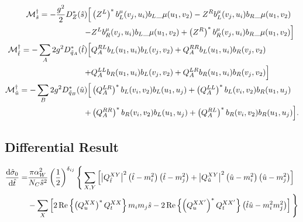 \documentclass[../main.tex]{subfiles}
\begin{document}
\begin{temporary}

	\begin{subequations}
		\begin{align}
			\nonumber
			\M^\dagger_{\hat{s}} = -\frac{g^2}{2} D_Z^\ast(\hat{s}) \Big[           & \pclosed{Z^L}^\ast b_L^\mu(v_j, u_i){b_L}\_{\mu}(u_1, v_2) - Z^R b_L^\mu(v_j, u_i){b_R}\_{\mu}(u_1, v_2)         \\
			-                                                                       & Z^L b_R^\mu(v_j, u_i){b_L}\_{\mu}(u_1, v_2) + \pclosed{Z^R}^\ast b_R^\mu(v_j, u_i){b_R}\_{\mu}(u_1, v_2) \Big]   \\
			\nonumber
			\M^\dagger_{\hat{t}} = -\sum_A 2g^2 D^\ast_{\tilde{q}_A}(\hat{t}) \Big[ & Q_A^{RL} b_L(u_1, u_i) b_L(v_j, v_2) +  Q_A^{RR} b_L(u_1, u_i) b_R(v_j, v_2)                                     \\
			+                                                                       & Q_A^{LL} b_R(u_1, u_i) b_L(v_j, v_2) + Q_A^{LR} b_R(u_1, u_i) b_R(v_j, v_2) \Big]                                \\
			\nonumber
			\M^\dagger_{\hat{u}} = -\sum_B 2g^2 D^\ast_{\tilde{q}_B}(\hat{u}) \Big[ & \pclosed{Q_A^{LR}}^\ast b_L(v_i, v_2) b_L(u_1, u_j) + \pclosed{Q_A^{LL}}^\ast b_L(v_i, v_2) b_R(u_1, u_j)        \\
			+                                                                       & \pclosed{Q_A^{RR}}^\ast b_R(v_i, v_2) b_L(u_1, u_j) + \pclosed{Q_A^{RL}}^\ast b_R(v_i, v_2) b_R(u_1, u_j) \Big].
		\end{align}
	\end{subequations}

\end{temporary}

\subsection{Differential Result}
\begin{align}
	\nonumber
	\d[\hat{t}]{\hat{\sigma}_0} = & \frac{\pi \alpha_W^2}{N_C \hat{s}^2} \pclosed{\frac{1}{2}}^{\delta_{ij}} \Bigg\{ \sum_{X,Y} \bclosed{\abs{Q^{XY}_{\hat{t}}}^2 \pclosed{\hat{t}-m_i^2}\pclosed{\hat{t}-m_j^2} + \abs{Q^{XY}_{\hat{u}}}^2 \pclosed{\hat{u}-m_i^2}\pclosed{\hat{u}-m_j^2}} \\
	                              & - \sum_X \bclosed{2\Re{\pclosed{Q_{u}^{XX}}^\ast Q_{t}^{XX}} m_i m_j \hat{s} - 2\Re{\pclosed{Q_{u}^{XX^\prime}}^\ast Q_{t}^{XX^\prime}} \pclosed{\hat{t}\hat{u} - m_i^2m_j^2}} \Bigg\}
\end{align}
\end{document}
